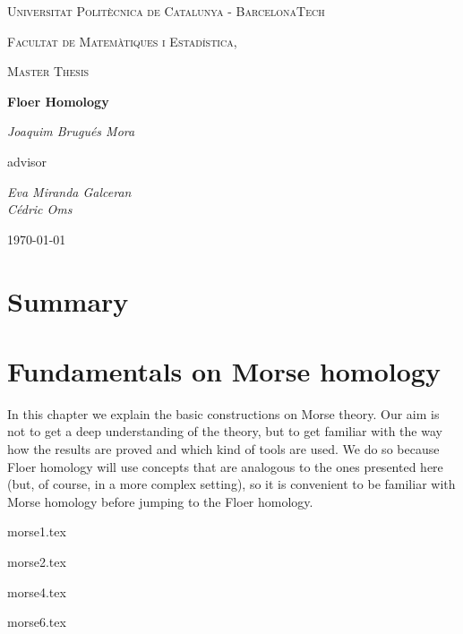 \documentclass[a4paper,11pt]{book}
\theoremstyle{indented}
\begin{document}
\begin{titlepage}
	\centering
	{\scshape\LARGE Universitat Politècnica de Catalunya - BarcelonaTech\par}
	{\scshape\LARGE Facultat de Matemàtiques i Estadística, \par}
	\vspace{1cm}
	{\scshape\Large Master Thesis\par}
	\vspace{1.5cm}
	{\huge\bfseries Floer Homology\par}
	\vspace{2cm}
	{\Large\itshape Joaquim Brugués Mora\par}
	\vfill
	advisor\par
	{\Large\itshape Eva Miranda Galceran \\ Cédric Oms \par}

	\vfill

	{\large \today\par}
\end{titlepage}


\chapter*{Summary}


\tableofcontents

\mainmatter

\chapter{Fundamentals on Morse homology}
In this chapter we explain the basic constructions on Morse theory. Our aim is not to get a deep understanding of the theory, but to get familiar with the way how the results are proved and which kind of tools are used. We do so because Floer homology will use concepts that are analogous to the ones presented here (but, of course, in a more complex setting), so it is convenient to be familiar with Morse homology before jumping to the Floer homology.

{morse1.tex}

 {morse2.tex}


 {morse4.tex}


 {morse6.tex}

\end{document}
